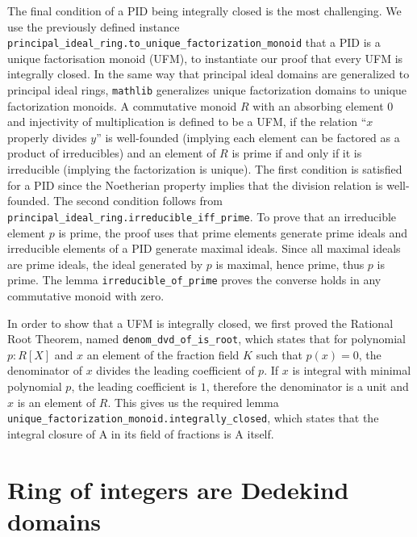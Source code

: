 \documentclass[a4paper,USenglish,cleveref, autoref, thm-restate]{lipics-v2021}
\newcommand{\lean}[1]{\texttt{#1}\xspace} %
\newcommand{\mathlib}{\texttt{mathlib}\xspace}
\begin{document}
The final condition of a PID being integrally closed is the most challenging.
We use the previously defined instance \lean{principal\_ideal\_ring.to\_unique\_factorization\_monoid} that a PID is a unique factorisation monoid (UFM),
to instantiate our proof that every UFM is integrally closed.
In the same way that principal ideal domains are generalized to principal ideal rings, \mathlib generalizes unique factorization domains to unique factorization monoids.
A commutative monoid $R$ with an absorbing element $0$ and injectivity of multiplication is defined to be a UFM,
if the relation ``$x$ properly divides $y$'' is well-founded (implying each element can be factored as a product of irreducibles) and
an element of $R$ is prime if and only if it is irreducible (implying the factorization is unique).
The first condition is satisfied for a PID since the Noetherian property implies that the division relation is well-founded.
The second condition follows from \lean{principal\_ideal\_ring.irreducible\_iff\_prime}.
To prove that an irreducible element $p$ is prime, the proof uses that prime elements generate prime ideals and irreducible elements of a PID generate maximal ideals. Since all maximal ideals are prime ideals, the ideal generated by $p$ is maximal, hence prime, thus $p$ is prime.
The lemma \lean{irreducible\_of\_prime} proves the converse holds in any commutative monoid with zero.

In order to show that a UFM is integrally closed, we first proved the Rational Root Theorem, named \lean{denom\_dvd\_of\_is\_root},
which states that for polynomial $p : R[X]$ and $x$ an element of the fraction field $K$ such that $p(x) = 0$, the denominator of $x$ divides the leading coefficient of $p$.
If $x$ is integral with minimal polynomial $p$, the leading coefficient is $1$, therefore the denominator is a unit and $x$ is an element of $R$.
This gives us the required lemma \lean{unique\_factorization\_monoid.integrally\_closed}, which states that the integral closure of A in its field of fractions is A itself.

\section{Ring of integers are Dedekind domains}
\end{document}
